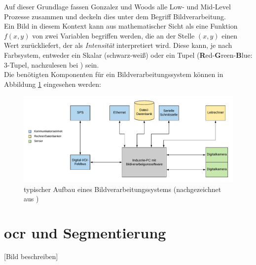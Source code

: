 		Auf dieser Grundlage fassen Gonzalez und Woods alle Low- und Mid-Level Prozesse zusammen und deckeln dies unter dem Begriff Bildverarbeitung. \\
		
		Ein Bild in diesem Kontext kann aus mathematischer Sicht als eine Funktion $f(x, y)$ von zwei Variablen begriffen werden, die an der Stelle $(x, y)$ einen Wert zurückliefert, der als \textit{Intensität} interpretiert wird. Diese kann, je nach Farbsystem, entweder ein Skalar (schwarz-weiß) oder ein Tupel (\textbf{R}ed-\textbf{G}reen-\textbf{B}lue: 3-Tupel, nachzulesen bei \cite{rgb-info}) sein. \\
		
		Die benötigten Komponenten für ein Bildverarbeitungssystem können in Abbildung \ref{fig:indust-imgproc} eingesehen werden:
		\begin{figure}[h]
			\includegraphics[width=\linewidth]{Industrielles-Bildverarbeitungssystem}
			\caption{typischer Aufbau eines Bildverarbeitungssystems (nachgezeichnet aus \cite[S. 7]{indust-imgproc})}
			\label{fig:indust-imgproc}
		\end{figure}
		\vfill
	\section{\gls{ocr} und Segmentierung}
	\color{red} [Bild beschreiben] \color{black}
	
